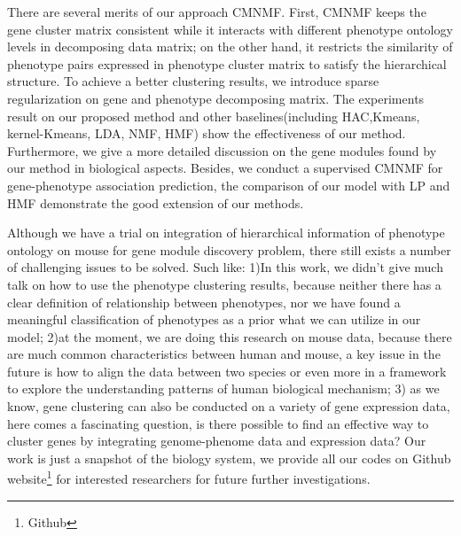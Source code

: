 \documentclass{bmcart}
\begin{document}
There are several merits of our approach CMNMF. First, CMNMF keeps the gene cluster matrix consistent while it interacts with different phenotype ontology levels in decomposing data matrix; on the other hand, it restricts the similarity of phenotype pairs expressed in phenotype cluster matrix to satisfy the hierarchical structure. To achieve a better clustering results, we introduce sparse regularization on gene and phenotype decomposing matrix. The experiments result on our proposed method and other baselines(including HAC,Kmeans, kernel-Kmeans, LDA, NMF, HMF) show the effectiveness of our method. Furthermore, we give a more detailed discussion on the gene modules found by our method in biological aspects. Besides, we conduct a supervised CMNMF for gene-phenotype association prediction, the comparison of our model with LP and HMF demonstrate the good extension of our methods.

Although we have a trial on integration of hierarchical information of phenotype ontology on mouse for gene module discovery problem, there still exists a number of challenging issues to be solved. Such like: 1)In this work, we didn't give much talk on how to use the phenotype clustering results, because neither there has a clear definition of relationship between phenotypes, nor we have found a meaningful classification of phenotypes as a prior what we can utilize in our model; 2)at the moment, we are doing this research on mouse data, because there are much common characteristics between human and mouse, a key issue in the future is how to align the data between two species or even more in a framework to explore the understanding patterns of human biological mechanism; 3) as we know, gene clustering can also be conducted on a variety of gene expression data, here comes a fascinating question, is there possible to find an effective way to cluster genes by integrating genome-phenome data and expression data? Our work is just a snapshot of the biology system, we provide all our codes on Github website\footnote{Github} for interested researchers for future further investigations.

\end{document}
